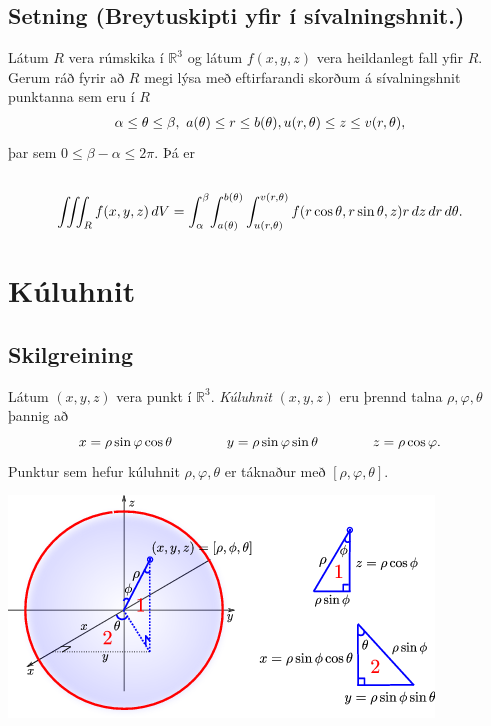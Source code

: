 \documentclass[a4paper,10pt,icelandic]{sphinxmanual}
\begin{document}
\subsection{Setning (Breytuskipti yfir í sívalningshnit.)}
\label{Kafli4:setning-breytuskipti-yfir-i-sivalningshnit}
Látum \(R\) vera rúmskika í \({\mathbb  R}^3\) og látum
\(f(x,y,z)\) vera heildanlegt fall yfir \(R\). Gerum ráð fyrir
að \(R\) megi lýsa með eftirfarandi skorðum á sívalningshnit
punktanna sem eru í \(R\)
\begin{gather}
\begin{split}\displaystyle \alpha\leq \theta\leq \beta,\ a(\theta)\leq r\leq  b(\theta), u(r,\theta)\leq z\leq v(r,\theta),\end{split}\notag
\end{gather}
þar sem \(0\leq \beta-\alpha\leq 2\pi\). Þá er
\begin{gather}
\begin{split}\displaystyle\end{split}\notag\\\begin{split}\int\!\!\!\int\!\!\!\int_R f(x,y,z)\,dV=
\int_\alpha^\beta
\!\int_{a(\theta)}^{b(\theta)}\int_{u(r,\theta)}^{v(r,\theta)}
f(r\cos\theta,r\sin\theta,z)r\,dz\,dr\,d\theta.\end{split}\notag
\end{gather}

\section{Kúluhnit}
\label{Kafli4:kuluhnit}

\subsection{Skilgreining}
\label{Kafli4:id19}
Látum \((x,y,z)\) vera punkt í \({\mathbb  R}^3\). \emph{Kúluhnit}
\((x,y,z)\) eru þrennd talna \(\rho, \varphi, \theta\) þannig að
\begin{gather}
\begin{split}\displaystyle x=\rho\sin\varphi\cos\theta\qquad\qquad y=\rho\sin\varphi\sin\theta\qquad\qquad z=\rho\cos\varphi.\end{split}\notag
\end{gather}
Punktur sem hefur kúluhnit \(\rho, \varphi, \theta\) er táknaður með
\([\rho, \varphi, \theta]\).

{\hfill\includegraphics[width=0.800\linewidth]{sphere.png}\hfill}
\end{document}

